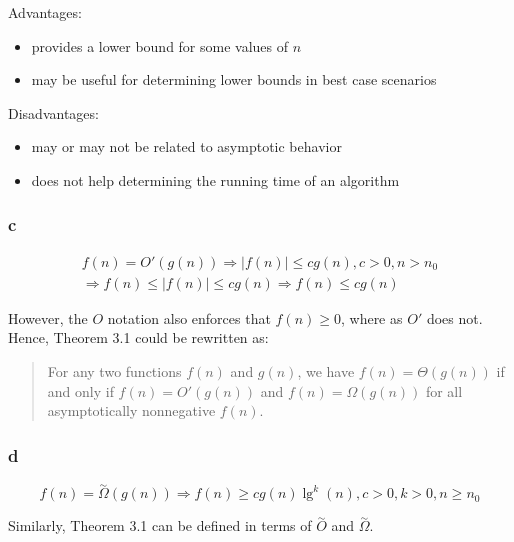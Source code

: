 \documentclass[8pt,a4paper]{article}
\begin{document}
  Advantages:

\begin{itemize}
  \item provides a lower bound for some values of $n$
  \item may be useful for determining lower bounds in best case scenarios
\end{itemize}

  Disadvantages:

\begin{itemize}
  \item may or may not be related to asymptotic behavior
  \item does not help determining the running time of an algorithm
\end{itemize}

\subsubsection*{c}

\begin{equation*}
  \begin{split}
    f(n) = O'(g(n)) \Rightarrow |f(n)| \leq c g(n), c > 0, n > n_{0} \\
    \Rightarrow f(n) \leq |f(n)| \leq c g(n) \Rightarrow f(n) \leq c g(n)
  \end{split}
\end{equation*}

  However, the $O$ notation also enforces that $f(n) \geq 0$, where as $O'$
does not. Hence, Theorem 3.1 could be rewritten as:

\begin{quotation}
  For any two functions $f(n)$ and $g(n)$, we have $f(n) = \Theta(g(n))$ if and
  only if $f(n) = O'(g(n))$ and $f(n) = \Omega(g(n))$ for all asymptotically nonnegative
  $f(n)$.
\end{quotation}

\subsubsection*{d}

\begin{equation*}
  f(n) = \overset{\sim}{\Omega}(g(n)) \Rightarrow f(n) \geq c g(n) \lg^{k}(n), c > 0, k > 0, n \geq n_{0}
\end{equation*}

  Similarly, Theorem 3.1 can be defined in terms of $\overset{\sim}{O}$ and $\overset{\sim}{\Omega}$.
\end{document}
